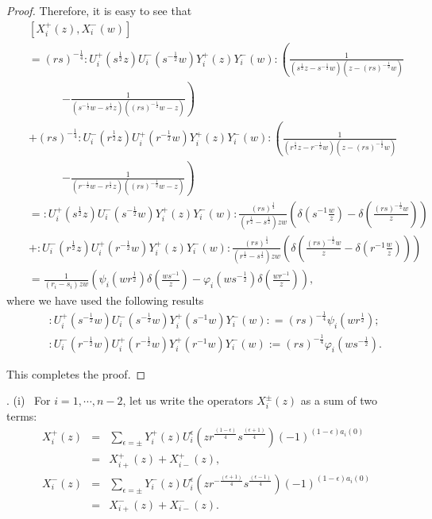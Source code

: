 \documentclass{amsproc}
\theoremstyle{remark}
\numberwithin{equation}{section}
\begin{document}
\begin{proof}
Therefore, it is easy to see that
\begin{eqnarray*}
&&[X^+_{i}(z), X^-_{i}(w)]\\
&&=(rs)^{-\frac{1}{4}}:U_i^+(s^{\frac{1}{2}}z)U_i^-(s^{-\frac{1}{2}}w)Y_i^+(z)Y_i^-(w):
\left(\frac1{(s^{\frac{1}{2}}z-s^{-\frac{1}{2}}w)
(z-(rs)^{-\frac{1}{2}}w)}\right.\\
&&\qquad\quad \left. -\frac 1{(s^{-\frac{1}{2}}w-s^{\frac{1}{2}}z)
((rs)^{-\frac{1}{2}}w-z)}\right)\\
&&+(rs)^{-\frac{1}{4}}:U_i^-(r^{\frac{1}{2}}z)U_i^+(r^{-\frac{1}{2}}w)Y_i^+(z)Y_i^-(w):
\left(\frac1{(r^{\frac{1}{2}}z-r^{-\frac{1}{2}}w)
(z-(rs)^{-\frac{1}{2}}w)}\right.\\
&&\qquad\quad \left.-\frac 1{(r^{-\frac{1}{2}}w-r^{\frac{1}{2}}z)
((rs)^{-\frac{1}{2}}w-z)}\right)\\
&&=:U_i^+(s^{\frac{1}{2}}z)U_i^-(s^{-\frac{1}{2}}w)Y_i^+(z)Y_i^-(w):
\frac{(rs)^{\frac{1}{4}}}{(r^{\frac{1}{2}}-s^{\frac{1}{2}})zw}
\left(\delta(s^{-1}\frac wz)-\delta(\frac{(rs)^{-\frac{1}{2}}w}{z} )
\right)\\
&&+:U_i^-(r^{\frac{1}{2}}z)U_i^+(r^{-\frac{1}{2}}w)Y_i^+(z)Y_i^-(w):
\frac{(rs)^{\frac{1}{4}}}{(r^{\frac{1}{2}}-s^{\frac{1}{2}})zw}
\left(\delta(\frac{(rs)^{-\frac{1}{2}}w}{z}-\delta(r^{-1}\frac wz)
 )\right)\\
&&=\frac1{(r_i-s_i)zw}
                 \left(
                 \psi_i(wr^{\frac{1}{2}})
                 \delta(\frac{ws^{-1}}{z})
                 -\varphi_i(ws^{-\frac{1}{2}})
                  \delta(\frac{wr^{-1}}z)
                 \right),
\end{eqnarray*}
where we have used the following results
\begin{eqnarray*}
&&:U_i^+(s^{-\frac{1}{2}}w)U_i^-(s^{-\frac{1}{2}}w)Y_i^+(s^{-1}w)Y_i^-(w):
=(rs)^{-\frac{1}{4}}\psi_i(wr^{\frac{1}{2}});\\
&&:U_i^-(r^{-\frac{1}{2}}w)U_i^+(r^{-\frac{1}{2}}w)Y_i^+(r^{-1}w)Y_i^-(w):=(rs)^{-\frac{1}{4}}\varphi_i(ws^{-\frac{1}{2}}).
\end{eqnarray*}

This completes the proof.
\end{proof}

. (i) \ For $i=1, \cdots, n-2$,
let us write the operators $X^{\pm}_i(z)$ as a sum of two terms:
\begin{eqnarray*}
X^{+}_i(z)&=&\sum_{{\epsilon}=\pm}Y_i^{+}(z)
U_i^{\epsilon}(zr^{\frac{(1-{\epsilon})}{4}}s^{\frac{({\epsilon}+1)}{4}})
(-1)^{(1-{\epsilon})a_i(0)}\\
&=& X^{+}_{i+}(z)+X^{+}_{i-}(z),\\
X^{-}_i(z)&=&\sum_{{\epsilon}=\pm}Y_i^{-}(z)
U_i^{\epsilon}(zr^{-\frac{({\epsilon}+1)}{4}}s^{\frac{({\epsilon}-1)}{4}})
(-1)^{(1-{\epsilon})a_i(0)}\\
&=& X^{-}_{i+}(z)+X^{-}_{i-}(z).
\end{eqnarray*}
\end{document}

